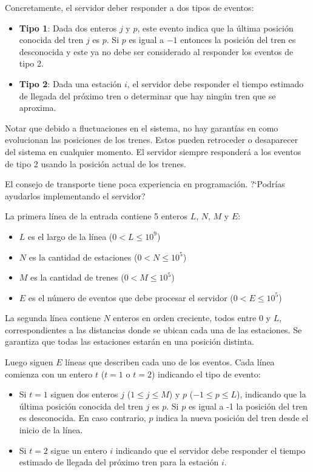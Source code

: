 \documentclass{oci}
\begin{document}
\begin{problemDescription}
  Concretamente, el servidor deber responder a dos tipos
  de eventos:
  \begin{itemize}
    \item \textbf{Tipo 1}: Dada dos enteros $j$ y $p$, este evento
    indica que la última posición conocida del tren $j$ es $p$.
    Si $p$ es igual a $-1$ entonces la posición del tren es desconocida
    y este ya no debe ser considerado al responder los eventos de tipo 2.
    \item \textbf{Tipo 2}: Dada una estación $i$, el servidor debe
    responder el tiempo estimado de llegada del próximo tren o determinar
    que hay ningún tren que se aproxima.
  \end{itemize}

  Notar que debido a fluctuaciones en el sistema, no hay garantías
  en como evolucionan las posiciones de los trenes.
  Estos pueden retroceder o desaparecer del sistema en cualquier momento.
  El servidor siempre responderá a los eventos de tipo 2 usando
  la posición actual de los trenes.

  El consejo de transporte tiene poca experiencia en programación.
  ?`Podrías ayudarlos implementando el servidor?
\end{problemDescription}

\begin{inputDescription}
  La primera línea de la entrada contiene 5 enteros $L$, $N$, $M$ y $E$:
  \begin{itemize}
    \item $L$ es el largo de la línea ($0 < L \leq 10^9$)
    \item $N$ es la cantidad de estaciones ($0 < N \leq 10^5$)
    \item $M$ es la cantidad de trenes ($0 < M \leq 10^5$)
    \item $E$ es el número de eventos que debe procesar el servidor ($0 < E \leq 10^5$)
  \end{itemize}
  La segunda línea contiene $N$ enteros en orden creciente, todos entre 0 y $L$,
  correspondientes a las distancias donde se ubican cada una de las estaciones.
  Se garantiza que todas las estaciones estarán en una posición distinta.

  Luego siguen $E$ líneas que describen cada uno de los eventos.
  Cada línea comienza con un entero $t$ ($t=1$ o $t=2$) indicando el tipo de evento:
  \begin{itemize}
  \item Si $t=1$ siguen dos enteros $j$ ($1\leq j \leq M$) y $p$ ($-1\leq p \leq L$),
  indicando que la última posición conocida del tren $j$ es $p$.
  Si $p$ es igual a -1 la posición del tren es desconocida.
  En caso contrario, $p$ indica la nueva posición del tren desde el inicio
  de la línea.
  \item Si $t=2$ sigue un entero $i$ indicando que el servidor debe responder el tiempo
  estimado de llegada del próximo tren para la estación $i$.
  \end{itemize}

\end{inputDescription}
\end{document}
